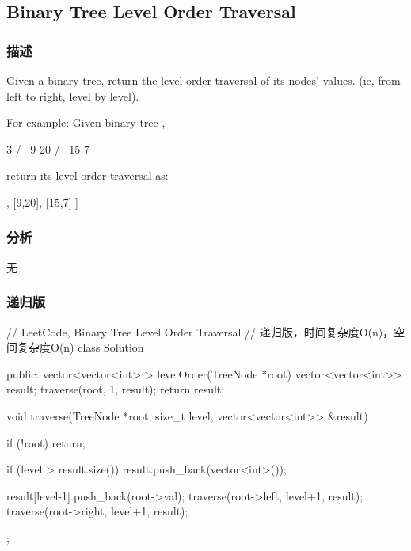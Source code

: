 \subsection{Binary Tree Level Order Traversal}
\label{sec:binary-tree-level-order-traversal}


\subsubsection{描述}
Given a binary tree, return the level order traversal of its nodes' values. (ie, from left to right, level by level).

For example:
Given binary tree ,
\begin{Code}
    3
   / \
  9  20
    /  \
   15   7
\end{Code}
return its level order traversal as:
\begin{Code}
[
  [3],
  [9,20],
  [15,7]
]
\end{Code}


\subsubsection{分析}
无


\subsubsection{递归版}
\begin{Code}
// LeetCode, Binary Tree Level Order Traversal
// 递归版，时间复杂度O(n)，空间复杂度O(n)
class Solution {
public:
    vector<vector<int> > levelOrder(TreeNode *root) {
        vector<vector<int>> result;
        traverse(root, 1, result);
        return result;
    }

    void traverse(TreeNode *root, size_t level, vector<vector<int>> &result) {
        if (!root) return;

        if (level > result.size())
            result.push_back(vector<int>());

        result[level-1].push_back(root->val);
        traverse(root->left, level+1, result);
        traverse(root->right, level+1, result);
    }
};
\end{Code}


